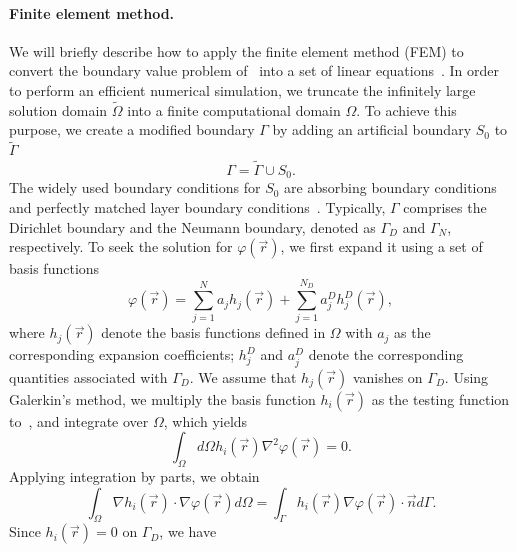 \documentclass[a4paper,onecolumn,11pt,unpublished]{quantumarticle}
\begin{document}
\paragraph{Finite element method.}We will briefly describe how to apply the finite element method (FEM) to convert the boundary value problem of~ into a set of linear equations~\cite{Jin2010The}.  
In order to perform an efficient numerical simulation, we truncate the infinitely large solution domain $\tilde{\Omega}$ into a finite computational domain $\Omega$. To achieve this purpose, we create a modified boundary $\Gamma$ by adding an artificial boundary $S_0$ to $\tilde{\Gamma}$
\begin{equation}
    \Gamma = \tilde{\Gamma} \cup S_0.
\end{equation}
The widely used boundary conditions for $S_0$ are absorbing boundary conditions and perfectly matched layer boundary conditions~\cite{Jin2010The}. Typically, $\Gamma$ comprises the Dirichlet boundary and the Neumann boundary, denoted as $\Gamma_D$ and  $\Gamma_N$, respectively. 
To seek the solution for $\varphi \left(\vec{r}\right)$, we first expand it using a set of basis functions
\begin{equation}
    \varphi \left(\vec{r}\right) = \sum_{j=1}^{N} a_j h_j \left(\vec{r}\right)
    +\sum_{j=1}^{N_{D}}a_{j}^{D}h_{j}^{D}\left(\vec{r}\right),
    \label{eq:basis_function}
\end{equation}
where $h_j\left( \vec{r} \right)$ denote the basis functions defined in $\Omega$ with $a_j$ as the corresponding expansion coefficients; $h_{j}^{D}$ and $a_{j}^{D}$ denote the corresponding quantities associated with $\Gamma_D$. We assume that $h_j\left( \vec{r} \right)$ vanishes on $\Gamma_D$. 
Using Galerkin's method, we multiply the basis function $h_i\left( \vec{r} \right)$ as the testing function to~, and integrate over $\Omega$, which yields
\begin{equation}
    \int_{\Omega} d\Omega h_{i}\left(\vec{r}\right)\nabla^{2}\varphi\left(\vec{r}\right) = 0.
\end{equation}
Applying integration by parts, we obtain
\begin{equation}
     \int_{\Omega}\nabla h_{i}\left(\vec{r}\right)\cdot\nabla\varphi\left(\vec{r}\right)d\Omega = \int_{\Gamma}h_{i}\left(\vec{r}\right)\nabla\varphi\left(\vec{r}\right)\cdot\vec{n}d\Gamma.
     \label{eq:integration_by_parts}
\end{equation}
Since $h_{i}\left(\vec{r}\right) = 0$ on $\Gamma_D$, we have
\end{document}
